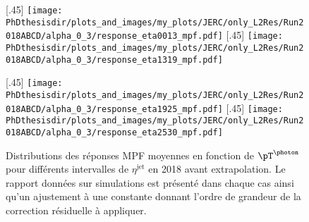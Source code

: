 \begin{figure}[p]
\centering
{}[.45\textwidth]
{\texttt{[image: \\PhDthesisdir/plots\_and\_images/my\_plots/JERC/only\_L2Res/Run2018ABCD/alpha\_0\_3/response\_eta0013\_mpf.pdf]}}
\hfill
{}[.45\textwidth]
{\texttt{[image: \\PhDthesisdir/plots\_and\_images/my\_plots/JERC/only\_L2Res/Run2018ABCD/alpha\_0\_3/response\_eta1319\_mpf.pdf]}}

\vfill

[.45\textwidth]
{\texttt{[image: \\PhDthesisdir/plots\_and\_images/my\_plots/JERC/only\_L2Res/Run2018ABCD/alpha\_0\_3/response\_eta1925\_mpf.pdf]}}
\hfill
{}[.45\textwidth]
{\texttt{[image: \\PhDthesisdir/plots\_and\_images/my\_plots/JERC/only\_L2Res/Run2018ABCD/alpha\_0\_3/response\_eta2530\_mpf.pdf]}}

\caption[Réponses MPF en 2018 avant extrapolation.]{Distributions des réponses MPF moyennes en fonction de $\pT^{\text{\photon}}$ pour différents intervalles de $\eta^\text{jet}$ en 2018 avant extrapolation. Le rapport données sur simulations est présenté dans chaque cas ainsi qu'un ajustement à une constante donnant l'ordre de grandeur de la correction résiduelle à appliquer.}
\label{fig-responses_MPF_alpha_0_3_2018ABCD}
\end{figure}